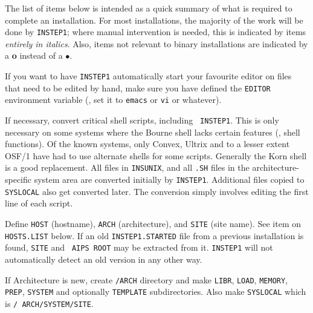 The list of items below is intended as a quick summary of what is required
to complete an installation.  For most installations, the majority of the
work will be done by {\tt INSTEP1}; where manual intervention is needed,
this is indicated by items {\it entirely in italics\/}.  Also, items not
relevant to binary installations are indicated by a {\bf o} instead of a
{$\bullet$}.\medskip

\item{}

\item\bul If you want to have {\tt INSTEP1} automatically start
        your favourite editor on files that need to be edited by hand,
        make sure you have defined the {\tt EDITOR} environment variable
        (\eg, set it to {\tt emacs} or {\tt vi} or whatever).

\item\bul If necessary, convert critical shell scripts, including {\tt
        INSTEP1}.  This is only necessary on some systems where the Bourne
        shell lacks certain features (\eg, shell functions).  Of the known
        systems, only Convex, Ultrix and to a lesser extent OSF/1 have had
        to use alternate shells for some scripts.  Generally the Korn
        shell is a good replacement.  All files in {\tt\dol INSUNIX}, and
        all {\tt *.SH} files in the architecture-specific system area are
        converted initially by {\tt INSTEP1}. Additional files copied to
        {\tt\dol SYSLOCAL} also get converted later.  The conversion
        simply involves editing the first line of each script.

\item\bul Define {\tt\dol HOST} (hostname), {\tt \dol ARCH}
        (architecture), and {\tt \dol SITE} (site name).  See item on {\tt
        HOSTS.LIST} below.  If an old {\tt INSTEP1.STARTED} file from a
        previous installation is found, {\tt\dol SITE} and {\tt\dol
        AIPS\- ROOT} may be extracted from it.  {\tt INSTEP1} will
        not automatically detect an old version in any other way.

\item\bul If Architecture is new, create {\tt \thisver/\dol ARCH}
        directory and make {\tt LIBR}, {\tt LOAD}, {\tt MEMORY}, {\tt
        PREP}, {\tt SYSTEM} and optionally {\tt TEMPLATE} subdirectories.
        Also make {\tt\dol SYSLOCAL} which is {\tt \thisver/\dol
        ARCH/\-SYS\-TEM/\-\dol SITE}.


